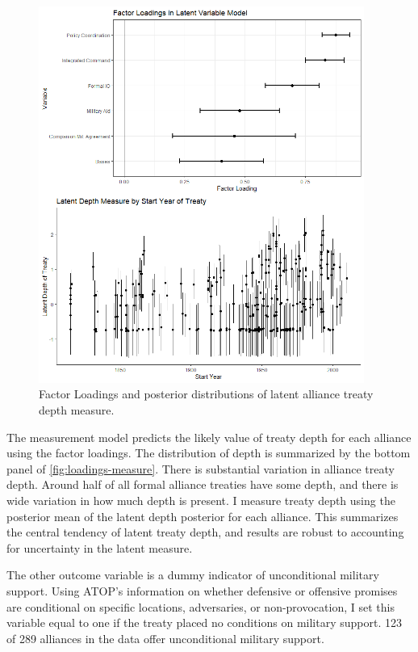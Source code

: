 \documentclass[12pt]{article}
\begin{document}
\begin{figure}[hbtp]
\centering
\includegraphics[width=0.95\textwidth]{../figures/loadings-measure.png}
\caption{Factor Loadings and posterior distributions of latent alliance treaty depth measure.}
\label{fig:loadings-measure}
\end{figure}


The measurement model predicts the likely value of treaty depth for each alliance using the factor loadings. 
The distribution of depth is summarized by the bottom panel of \autoref{fig:loadings-measure}. 
There is substantial variation in alliance treaty depth. 
Around half of all formal alliance treaties have some depth, and there is wide variation in how much depth is present.
I measure treaty depth using the posterior mean of the latent depth posterior for each alliance. 
This summarizes the central tendency of latent treaty depth, and results are robust to accounting for uncertainty in the latent measure. 


The other outcome variable is a dummy indicator of unconditional military support. 
Using ATOP's information on whether defensive or offensive promises are conditional on specific locations, adversaries, or non-provocation, I set this variable equal to one if the treaty placed no conditions on military support.
123 of 289 alliances in the data offer unconditional military support. 
\end{document}

